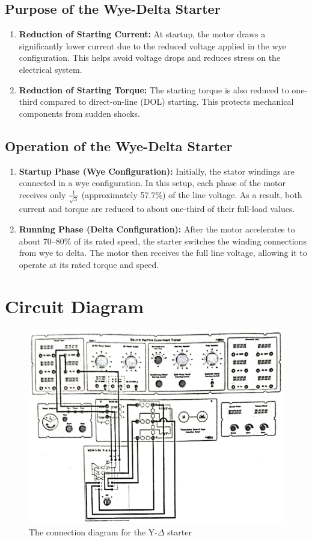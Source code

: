\documentclass[a4paper,12pt]{article}
\begin{document}
	\subsection*{Purpose of the Wye-Delta Starter}
	
	\begin{enumerate}
		\item \textbf{Reduction of Starting Current:} At startup, the motor draws a significantly lower current due to the reduced voltage applied in the wye configuration. This helps avoid voltage drops and reduces stress on the electrical system.
		\item \textbf{Reduction of Starting Torque:} The starting torque is also reduced to one-third compared to direct-on-line (DOL) starting. This protects mechanical components from sudden shocks.
	\end{enumerate}
	
	\subsection*{Operation of the Wye-Delta Starter}
	
	\begin{enumerate}
		\item \textbf{Startup Phase (Wye Configuration):} Initially, the stator windings are connected in a wye configuration. In this setup, each phase of the motor receives only $\frac{1}{\sqrt{3}}$ (approximately 57.7\%) of the line voltage. As a result, both current and torque are reduced to about one-third of their full-load values.
		\item \textbf{Running Phase (Delta Configuration):} After the motor accelerates to about 70--80\% of its rated speed, the starter switches the winding connections from wye to delta. The motor then receives the full line voltage, allowing it to operate at its rated torque and speed.
	\end{enumerate}
	
	
	\section{Circuit Diagram}
	\begin{figure}[H]
		\centering
			\includegraphics[width=0.6\linewidth]{Images/2}
		\caption{The connection diagram for the Y-$\Delta$ starter}
	\end{figure}
	
\end{document}
